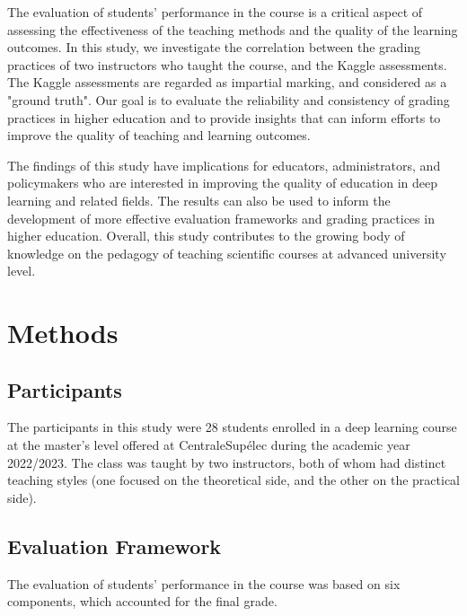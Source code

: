 \documentclass[a4paper]{article}
\begin{document}
	The evaluation of students' performance in the course is a critical aspect of assessing the effectiveness of the teaching methods and the quality of the learning outcomes.
	In this study, we investigate the correlation between the grading practices of two instructors who taught the course, and the Kaggle assessments.
	The Kaggle assessments are regarded as impartial marking, and considered as a "ground truth".
	Our goal is to evaluate the reliability and consistency of grading practices in higher education and to provide insights that can inform efforts to improve the quality of teaching and learning outcomes.
	
	The findings of this study have implications for educators, administrators, and policymakers who are interested in improving the quality of education in deep learning and related fields.
	The results can also be used to inform the development of more effective evaluation frameworks and grading practices in higher education.
	Overall, this study contributes to the growing body of knowledge on the pedagogy of teaching scientific courses at advanced university level.
	
	\section{Methods}
	\subsection{Participants}
	The participants in this study were 28 students enrolled in a deep learning course at the master's level offered at CentraleSupélec during the academic year 2022/2023.
	The class was taught by two instructors, both of whom had distinct teaching styles (one focused on the theoretical side, and the other on the practical side).
	
	\subsection{Evaluation Framework}
	The evaluation of students' performance in the course was based on six components, which accounted for the final grade.
	
\end{document}
